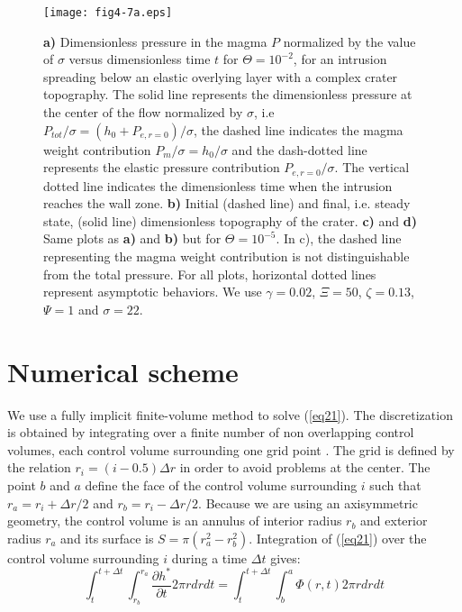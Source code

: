 \begin{article}
\begin{figure}[pb]
\graphicspath{{/Users/thorey/Documents/These/Submission/Article/FFC_JGR_2013/Paper_APRES_2nd_REVIEW/}}
  \centering
  \noindent\texttt{[image: fig4-7a.eps]}
  \caption{\textbf{a)}  Dimensionless   pressure  in  the   magma  $P$
    normalized by the value of  $\sigma$ versus dimensionless time $t$
    for $\Theta=10^{-2}$, for an  intrusion spreading below an elastic
    overlying layer with  a complex crater topography.  The solid line
    represents the  dimensionless pressure at  the center of  the flow
    normalized              by              $\sigma$,              i.e
    $P_{tot}/\sigma=(h_0+P_{e,r=0})/\sigma$, the dashed line indicates
    the  magma  weight  contribution $P_m/\sigma=h_0/\sigma$  and  the
    dash-dotted  line  represents  the elastic  pressure  contribution
    $P_{e,r=0}/\sigma$.  The   vertical  dotted  line   indicates  the
    dimensionless   time  when   the   intrusion   reaches  the   wall
    zone.  \textbf{b)} Initial  (dashed line)  and final,  i.e. steady
    state,    (solid   line)    dimensionless   topography    of   the
    crater. \textbf{c)} and \textbf{d)}  Same plots as \textbf{a)} and
    \textbf{b)}  but  for $\Theta=10^{-5}$.  In  c),  the dashed  line
    representing the magma weight  contribution is not distinguishable
    from the  total pressure. For  all plots, horizontal  dotted lines
    represent  asymptotic behaviors.  We use  $\gamma=0.02$, $\Xi=50$,
    $\zeta=0.13$, $\Psi=1$ and $\sigma=22$.}
  \label{fig4-7}
\end{figure}

\appendix
{}
\section{Numerical scheme}
\label{AppendixA}

We use a fully implicit finite-volume method to solve (\ref{eq21}). The discretization is obtained by integrating over a finite number of non overlapping control volumes, each control volume surrounding one grid point \citep{Patankar1980}. The grid is defined by the relation $r_{i}=(i-0.5)\Delta r$ in order to avoid problems at the center. The point $b$ and $a$ define the face of the control volume surrounding $i$ such that $r_{a}=r_{i}+\Delta r/2$ and $r_{b}=r_{i}-\Delta r/2$. Because we are using an axisymmetric geometry, the control volume is an annulus of interior radius $r_b$ and exterior radius $r_a$ and its surface is $S=\pi(r_{a}^{2}-r_{b}^{2})$. Integration of (\ref{eq21}) over the control volume surrounding $i$ during a time $\Delta t$ gives:
	\begin{equation}
	\int_{t}^{t+\Delta t} \int_{r_b}^{r_a} \frac{\partial h^{*}}{\partial t} 2\pi r dr dt=\int_{t}^{t+\Delta t} \int_{b}^{a} \Phi(r,t) 2\pi r dr dt
	\label{eq27}
	 \end{equation}
 

\end{article}
